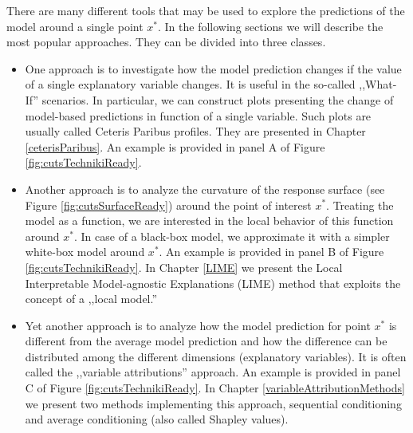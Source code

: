 \documentclass[]{krantz}
\providecommand{\tightlist}{%
  \setlength{\itemsep}{0pt}\setlength{\parskip}{0pt}}
\theoremstyle{definition}
\theoremstyle{definition}
\theoremstyle{definition}
\theoremstyle{remark}
\begin{document}
There are many different tools that may be used to explore the
predictions of the model around a single point \(x^*\). In the following
sections we will describe the most popular approaches. They can be
divided into three classes.

\begin{itemize}
\tightlist
\item
  One approach is to investigate how the model prediction changes if the
  value of a single explanatory variable changes. It is useful in the
  so-called ,,What-If'' scenarios. In particular, we can construct plots
  presenting the change of model-based predictions in function of a
  single variable. Such plots are usually called Ceteris Paribus
  profiles. They are presented in Chapter \ref{ceterisParibus}. An
  example is provided in panel A of Figure \ref{fig:cutsTechnikiReady}.
\item
  Another approach is to analyze the curvature of the response surface
  (see Figure \ref{fig:cutsSurfaceReady}) around the point of interest
  \(x^*\). Treating the model as a function, we are interested in the
  local behavior of this function around \(x^*\). In case of a black-box
  model, we approximate it with a simpler white-box model around
  \(x^*\). An example is provided in panel B of Figure
  \ref{fig:cutsTechnikiReady}. In Chapter \ref{LIME} we present the
  Local Interpretable Model-agnostic Explanations (LIME) method that
  exploits the concept of a ,,local model.''
\item
  Yet another approach is to analyze how the model prediction for point
  \(x^*\) is different from the average model prediction and how the
  difference can be distributed among the different dimensions
  (explanatory variables). It is often called the ,,variable
  attributions'' approach. An example is provided in panel C of Figure
  \ref{fig:cutsTechnikiReady}. In Chapter
  \ref{variableAttributionMethods} we present two methods implementing
  this approach, sequential conditioning and average conditioning (also
  called Shapley values).
\end{itemize}
\end{document}
